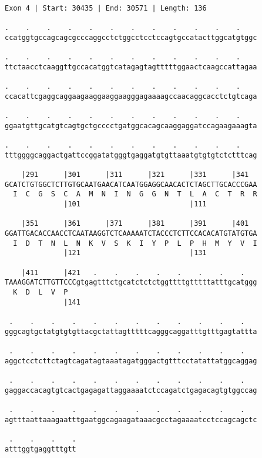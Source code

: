\documentclass{article}
\begin{document}
\begin{Verbatim}
Exon 4 | Start: 30435 | End: 30571 | Length: 136
 
.    .    .    .    .    .    .    .    .    .    .    .    
ccatggtgccagcagcgcccaggcctctggcctcctccagtgccatacttggcatgtggc
  
.    .    .    .    .    .    .    .    .    .    .    .    
ttctaacctcaaggttgccacatggtcatagagtagtttttggaactcaagccattagaa
  
.    .    .    .    .    .    .    .    .    .    .    .    
ccacattcgaggcaggaagaaggaaggaagggagaaaagccaacaggcacctctgtcaga
  
.    .    .    .    .    .    .    .    .    .    .    .    
ggaatgttgcatgtcagtgctgcccctgatggcacagcaaggaggatccagaagaaagta
  
.    .    .    .    .    .    .    .    .    .    .    .    
tttggggcaggactgattccggatatgggtgaggatgtgttaaatgtgtgtctctttcag
  
    |291      |301      |311      |321      |331      |341  
GCATCTGTGGCTCTTGTGCAATGAACATCAATGGAGGCAACACTCTAGCTTGCACCCGAA
  I  C  G  S  C  A  M  N  I  N  G  G  N  T  L  A  C  T  R  R
              |101                          |111            
  
    |351      |361      |371      |381      |391      |401  
GGATTGACACCAACCTCAATAAGGTCTCAAAAATCTACCCTCTTCCACACATGTATGTGA
  I  D  T  N  L  N  K  V  S  K  I  Y  P  L  P  H  M  Y  V  I
              |121                          |131            
  
    |411      |421   .    .    .    .    .    .    .    .   
TAAAGGATCTTGTTCCCgtgagtttctgcatctctctggttttgtttttatttgcatggg
  K  D  L  V  P                                             
              |141                                          
  
 .    .    .    .    .    .    .    .    .    .    .    .   
gggcagtgctatgtgtgttacgctattagtttttcagggcaggatttgtttgagtattta
  
 .    .    .    .    .    .    .    .    .    .    .    .   
aggctcctcttctagtcagatagtaaatagatgggactgtttcctatattatggcaggag
  
 .    .    .    .    .    .    .    .    .    .    .    .   
gaggaccacagtgtcactgagagattaggaaaatctccagatctgagacagtgtggccag
  
 .    .    .    .    .    .    .    .    .    .    .    .   
agtttaattaaagaatttgaatggcagaagataaacgcctagaaaatcctccagcagctc
  
 .    .    .    .
atttggtgaggtttgtt
\end{Verbatim}
\newpage
\end{document}
